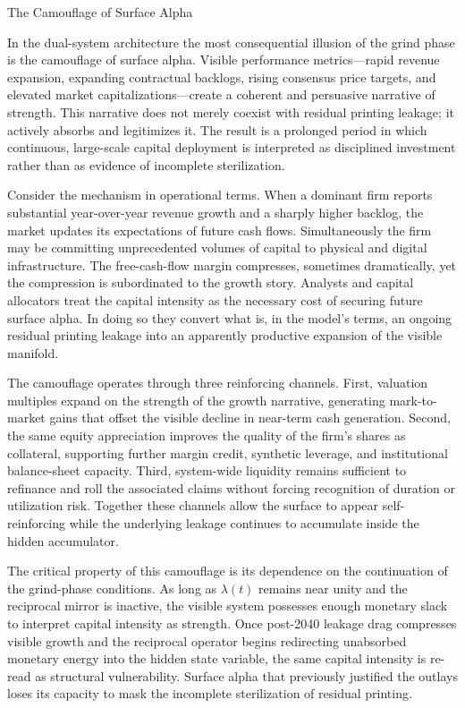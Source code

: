 The Camouflage of Surface Alpha

In the dual-system architecture the most consequential illusion of the grind phase is the camouflage of surface alpha. Visible performance metrics—rapid revenue expansion, expanding contractual backlogs, rising consensus price targets, and elevated market capitalizations—create a coherent and persuasive narrative of strength. This narrative does not merely coexist with residual printing leakage; it actively absorbs and legitimizes it. The result is a prolonged period in which continuous, large-scale capital deployment is interpreted as disciplined investment rather than as evidence of incomplete sterilization.

Consider the mechanism in operational terms. When a dominant firm reports substantial year-over-year revenue growth and a sharply higher backlog, the market updates its expectations of future cash flows. Simultaneously the firm may be committing unprecedented volumes of capital to physical and digital infrastructure. The free-cash-flow margin compresses, sometimes dramatically, yet the compression is subordinated to the growth story. Analysts and capital allocators treat the capital intensity as the necessary cost of securing future surface alpha. In doing so they convert what is, in the model’s terms, an ongoing residual printing leakage into an apparently productive expansion of the visible manifold.

The camouflage operates through three reinforcing channels. First, valuation multiples expand on the strength of the growth narrative, generating mark-to-market gains that offset the visible decline in near-term cash generation. Second, the same equity appreciation improves the quality of the firm’s shares as collateral, supporting further margin credit, synthetic leverage, and institutional balance-sheet capacity. Third, system-wide liquidity remains sufficient to refinance and roll the associated claims without forcing recognition of duration or utilization risk. Together these channels allow the surface to appear self-reinforcing while the underlying leakage continues to accumulate inside the hidden accumulator.

The critical property of this camouflage is its dependence on the continuation of the grind-phase conditions. As long as \(\lambda(t)\) remains near unity and the reciprocal mirror is inactive, the visible system possesses enough monetary slack to interpret capital intensity as strength. Once post-2040 leakage drag compresses visible growth and the reciprocal operator begins redirecting unabsorbed monetary energy into the hidden state variable, the same capital intensity is re-read as structural vulnerability. Surface alpha that previously justified the outlays loses its capacity to mask the incomplete sterilization of residual printing.

